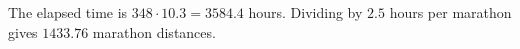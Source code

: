 The elapsed time is $348\cdot10.3=3584.4$ hours. Dividing by $2.5$ hours per marathon gives $\boxed{1433.76}$ marathon distances.
